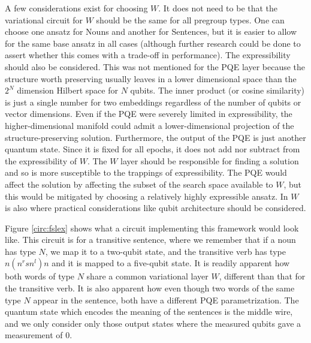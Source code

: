 A few considerations exist for choosing $W$. It does not need to be that the variational circuit for $W$ should be the same for all pregroup types. One can choose one ansatz for Nouns and another for Sentences, but it is easier to allow for the same base ansatz in all cases (although further research could be done to assert whether this comes with a trade-off in performance). The expressibility should also be considered. This was not mentioned for the PQE layer because the structure worth preserving usually leaves in a lower dimensional space than the $2^N$ dimension Hilbert space for $N$ qubits. The inner product (or cosine similarity) is just a single number for two embeddings regardless of the number of qubits or vector dimensions. Even if the PQE were severely limited in expressibility, the higher-dimensional manifold could admit a lower-dimensional projection of the structure-preserving solution. Furthermore, the output of the PQE is just another quantum state. Since it is fixed for all epochs, it does not add nor subtract from the expressibility of $W$. The $W$ layer should be responsible for finding a solution and so is more susceptible to the trappings of expressibility. The PQE would affect the solution by affecting the subset of the search space available to $W$, but this would be mitigated by choosing a relatively highly expressible ansatz. In $W$ is also where practical considerations like qubit architecture should be considered.

Figure \ref{circ:fslex} shows what a circuit implementing this framework would look like. This circuit is for a transitive sentence, where we remember that if a noun has type $N$, we map it to a two-qubit state, and the transitive verb has type $n(n^rsn^l)n$ and it is mapped to a five-qubit state. It is readily apparent how both words of type $N$ share a common variational layer $W$, different than that for the transitive verb. It is also apparent how even though two words of the same type $N$ appear in the sentence, both have a different PQE parametrization. The quantum state which encodes the meaning of the sentences is the middle wire, and we only consider only those output states where the measured qubits gave a measurement of 0. 



